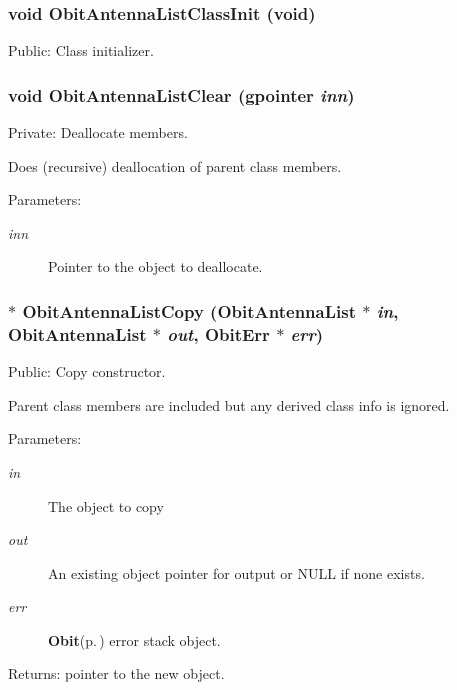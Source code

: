 \subsubsection{\setlength{\rightskip}{0pt plus 5cm}void Obit\-Antenna\-List\-Class\-Init (void)}\label{ObitAntennaList_8c_a14}


Public: Class initializer. 

\subsubsection{\setlength{\rightskip}{0pt plus 5cm}void Obit\-Antenna\-List\-Clear (gpointer {\em inn})}\label{ObitAntennaList_8c_a4}


Private: Deallocate members. 

Does (recursive) deallocation of parent class members. \begin{Desc}
\item[Parameters:]
\begin{description}
\item[{\em inn}]Pointer to the object to deallocate. \end{description}
\end{Desc}
\subsubsection{$\ast$ Obit\-Antenna\-List\-Copy ({\bf Obit\-Antenna\-List} $\ast$ {\em in}, {\bf Obit\-Antenna\-List} $\ast$ {\em out}, {\bf Obit\-Err} $\ast$ {\em err})}\label{ObitAntennaList_8c_a9}


Public: Copy constructor. 

Parent class members are included but any derived class info is ignored. \begin{Desc}
\item[Parameters:]
\begin{description}
\item[{\em in}]The object to copy \item[{\em out}]An existing object pointer for output or NULL if none exists. \item[{\em err}]{\bf Obit}{\rm (p.\,\pageref{structObit})} error stack object. \end{description}
\end{Desc}
\begin{Desc}
\item[Returns:]pointer to the new object. \end{Desc}
